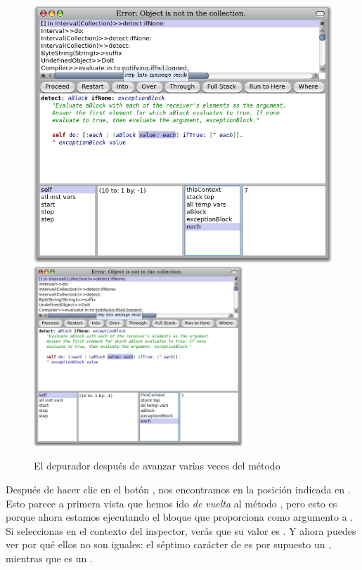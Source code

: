 \documentclass[spanish,a4paper,10pt,twoside]{book}
\begin{document}
\begin{figure}[btp]
	\begin{center}
	\ifluluelse
		{\includegraphics[width=\textwidth]{steppingIntoValue}}
		{\includegraphics[width=0.7\textwidth]{steppingIntoValue}}
	\end{center}
	\caption{El depurador despu\'es de avanzar varias veces  del m\'etodo  }
\end{figure}

Despu\'es de hacer clic en el bot\'on , nos encontramos en la posici\'on indicada en .
Esto parece a primera vista que hemos ido \emph{de vuelta} al m\'etodo  , pero esto es porque ahora estamos ejecutando el bloque que  proporciona como argumento a .
Si seleccionas  en el contexto del inspector, ver\'as que su valor es .
Y ahora puedes ver por qu\'e ellos no son iguales: el s\'eptimo car\'acter de  es por supuesto un , mientras que  es un .
\end{document}
